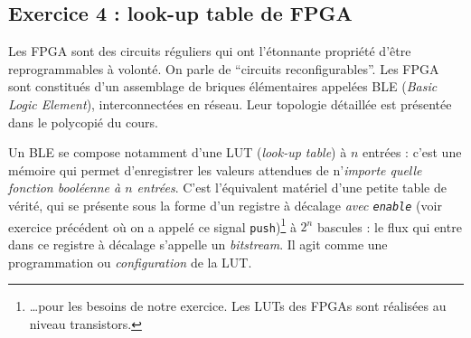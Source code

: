 \documentclass[a4paper,11pt]{article}
\newif\ifsolutions
\begin{document}
\ifsolutions
\begin{solbox}
\begin{enumerate}
    \item La moyenne donne : $$\dots, ?, ?, ?, 0, 2, 4, 7, 8, 7, 5, 2, 2, 0, 0, \dots$$

    \item Une solution consiste à réaliser les additions en parallèle. Une seconde à les chaîner. Il n'y a pas de meilleure solution, tant que la fréquence du circuit est atteinte. Il faut pour cela calculer le chemin critique dans les deux cas.

    \item On se convainc assez facilement que pour 4 données de 8 bits, il faut \textbf{10 bits}. Pour la moyenne mobile on est ramené à \textbf{8 bits}.

    \item Soit $D(x)$ le nombre de bits nécessaire pour coder $x$ (entier positif non signé). On a $D(x) = \lfloor \log_2(x) + 1 \rfloor$. Pour l'addition $S$ de $n$ données codées sur $m$ bits, on a donc :
    $$ D(S) = \lfloor \log_2(n \cdot (2^m - 1)) + 1 \rfloor $$

    \item $4 + 4 = 8$ ns. On inverse : la fréquence atteignable est de $\mathbf{125\ MHz}$ au maximum. C'est parfaitement compatible avec la fréquence de 100 MHz : il faudra veiller à ce que le circuit fonctionne exactement à la même fréquence que l'émetteur des données.
\end{enumerate}
\end{solbox}
\fi

\subsection*{Exercice 4 : look-up table de FPGA}
Les FPGA sont des circuits réguliers qui ont l'étonnante propriété d'être reprogrammables à volonté. On parle de ``circuits reconfigurables''. Les FPGA sont constitués d'un assemblage de briques élémentaires appelées BLE (\textit{Basic Logic Element}), interconnectées en réseau. Leur topologie détaillée est présentée dans le polycopié du cours.

Un BLE se compose notamment d'une LUT (\textit{look-up table}) à $n$ entrées : c'est une mémoire qui permet d'enregistrer les valeurs attendues de n'\textit{importe quelle fonction booléenne à $n$ entrées}. C'est l'équivalent matériel d'une petite table de vérité, qui se présente sous la forme d'un registre à décalage \textit{avec \texttt{enable}} (voir exercice précédent où on a appelé ce signal \texttt{push})\footnote{\dots pour les besoins de notre exercice. Les LUTs des FPGAs sont réalisées au niveau transistors.} à $2^n$ bascules : le flux qui entre dans ce registre à décalage s'appelle un \textit{bitstream}. Il agit comme une programmation ou \textit{configuration} de la LUT.
\end{document}

